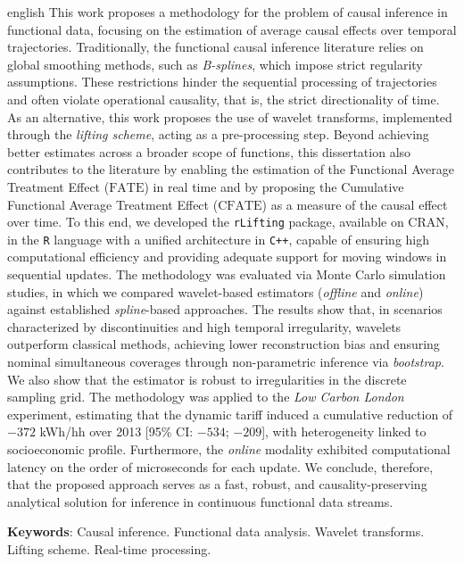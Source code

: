 \begin{resumo}[Abstract]
 \begin{otherlanguage*}{english}
    This work proposes a methodology for the problem of causal inference in functional data, focusing on the estimation of average causal effects over temporal trajectories. 
    Traditionally, the functional causal inference literature relies on global smoothing methods, such as \emph{B-splines}, which impose strict regularity assumptions. 
    These restrictions hinder the sequential processing of trajectories and often violate operational causality, that is, the strict directionality of time. 
    As an alternative, this work proposes the use of wavelet transforms, implemented through the \emph{lifting scheme}, acting as a pre-processing step. 
    Beyond achieving better estimates across a broader scope of functions, this dissertation also contributes to the literature by enabling the estimation of the Functional Average Treatment Effect (\(\mathrm{FATE}\)) in real time and by proposing the Cumulative Functional Average Treatment Effect (\(\mathrm{CFATE}\)) as a measure of the causal effect over time. 
    To this end, we developed the \texttt{rLifting} package, available on CRAN, in the \texttt{R} language with a unified architecture in \texttt{C++}, capable of ensuring high computational efficiency and providing adequate support for moving windows in sequential updates. 
    The methodology was evaluated via Monte Carlo simulation studies, in which we compared wavelet-based estimators (\emph{offline} and \emph{online}) against established \emph{spline}-based approaches. 
    The results show that, in scenarios characterized by discontinuities and high temporal irregularity, wavelets outperform classical methods, achieving lower reconstruction bias and ensuring nominal simultaneous coverages through non-parametric inference via \emph{bootstrap}. 
    We also show that the estimator is robust to irregularities in the discrete sampling grid. 
    The methodology was applied to the \emph{Low Carbon London} experiment, estimating that the dynamic tariff induced a cumulative reduction of \(-372\) kWh/hh over 2013 [95\% CI: \(-534\); \(-209\)], with heterogeneity linked to socioeconomic profile. 
    Furthermore, the \emph{online} modality exhibited computational latency on the order of microseconds for each update. 
    We conclude, therefore, that the proposed approach serves as a fast, robust, and causality-preserving analytical solution for inference in continuous functional data streams.

    \textbf{Keywords}: Causal inference. Functional data analysis. Wavelet transforms. Lifting scheme. Real-time processing.
 \end{otherlanguage*}
\end{resumo}
